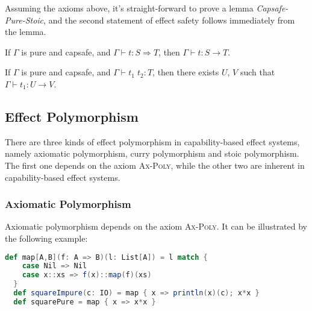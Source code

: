 Assuming the axioms above, it's straight-forward to prove a lemma
\emph{Capsafe-Pure-Stoic}, and the second statement of effect safety
follows immediately from the lemma.

\begin{lemma}
  If $\Gamma$ is pure and capsafe,  and $\Gamma \vdash t : S
  \Rightarrow T$, then $\Gamma \vdash t : S \to T$.
\end{lemma}

\begin{theorem}
  If $\Gamma$ is pure and capsafe, and $\Gamma \vdash t_1 \; t_2 : T$,
  then there exists $U$, $V$ such that $\Gamma \vdash t_1 : U \to V$.
\end{theorem}


\subsection{Effect Polymorphism}

\label{sec:effect-polymorphism}

There are three kinds of effect polymorphism in capability-based
effect systems, namely axiomatic polymorphism, curry polymorphism and
stoic polymorphism. The first one depends on the axiom
\textsc{Ax-Poly}, while the other two are inherent in capability-based
effect systems.

\subsubsection{Axiomatic Polymorphism}

Axiomatic polymorphism depends on the axiom \textsc{Ax-Poly}. It can
be illustrated by the following example:

\begin{lstlisting}[language=Scala]
  def map[A,B](f: A => B)(l: List[A]) = l match {
    case Nil => Nil
    case x::xs => f(x)::map(f)(xs)
  }
  def squareImpure(c: IO) = map { x => println(x)(c); x*x }
  def squarePure = map { x => x*x }
\end{lstlisting}


